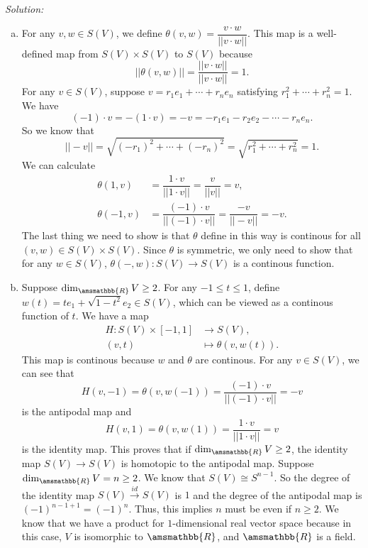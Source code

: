 \documentclass[letterpaper, 12pt]{article}
\newenvironment{solution}
		{\textit{Solution:}}
		{}
\renewcommand{\mathbb}{\amsmathbb}
\begin{document}
\begin{solution}
\begin{enumerate}[(a)]
\item For any \(v,w\in S(V)\), we define \(\theta(v,w)=\dfrac{v\cdot w}{||v\cdot w||}\). This map is a well-defined map from \(S(V)\times S(V)\) to \(S(V)\) because 
\[||\theta(v,w)||=\dfrac{||v\cdot w||}{||v\cdot w||}=1.\]
For any \(v\in S(V)\), suppose \(v=r_1e_1+\cdots+r_ne_n\) satisfying \(r_1^2+\cdots+r_n^2=1\). We have 
\[(-1)\cdot v=-(1\cdot v)=-v=-r_1e_1-r_2e_2-\cdots-r_ne_n.\]
So we know that 
\[||-v||=\sqrt{(-r_1)^2+\cdots+(-r_n)^2}=\sqrt{r_1^2+\cdots+r_n^2}=1.\]
We can calculate 
\begin{align*}
    \theta(1,v)&=\dfrac{1\cdot v}{||1\cdot v||}=\dfrac{v}{||v||}=v,\\ 
    \theta(-1,v)&=\dfrac{(-1)\cdot v}{||(-1)\cdot v||}=\dfrac{-v}{||-v||}=-v.
\end{align*}
The last thing we need to show is that \(\theta\) define in this way is continous for all \((v,w)\in S(V)\times S(V)\). Since \(\theta\) is symmetric, we only need to show that for any \(w\in S(V)\), 
\(\theta(-,w):S(V)\rightarrow S(V)\) is a continous function. 
\item Suppose \(\dim_{\mathbb{R}}V\geq 2\). For any \(-1\leq t\leq 1\), define \(w(t)=te_1+\sqrt{1-t^2}e_2\in S(V)\), which can be viewed as a continous function of \(t\). We have a map 
\begin{align*}
    H:S(V)\times [-1,1]&\rightarrow S(V),\\ 
    (v,t)&\mapsto \theta(v,w(t)). 
\end{align*}
This map is continous because \(w\) and \(\theta\) are continous. For any \(v\in S(V)\), we can see that  
\[H(v,-1)=\theta(v,w(-1))=\dfrac{(-1)\cdot v}{||(-1)\cdot v||}=-v\]
is the antipodal map and 
\[H(v,1)=\theta(v,w(1))=\dfrac{1\cdot v}{||1\cdot v||}=v\]
is the identity map. This proves that if \(\dim_{\mathbb{R}}V\geq 2\), the identity map \(S(V)\rightarrow S(V)\) is homotopic to the antipodal map. Suppose \(\dim_{\mathbb{R}}V=n\geq 2\). We know that \(S(V)\cong S^{n-1}\). So 
the degree of the identity map \(S(V)\xrightarrow{id}S(V)\) is \(1\) and the degree of the antipodal map is \((-1)^{n-1+1}=(-1)^n\). Thus, this implies \(n\) must be even if \(n\geq 2\). We know that we have a product for \(1\)-dimensional 
real vector space because in this case, \(V\) is isomorphic to \(\mathbb{R}\), and \(\mathbb{R}\) is a field. 
\end{enumerate}
\end{solution}
\end{document}
